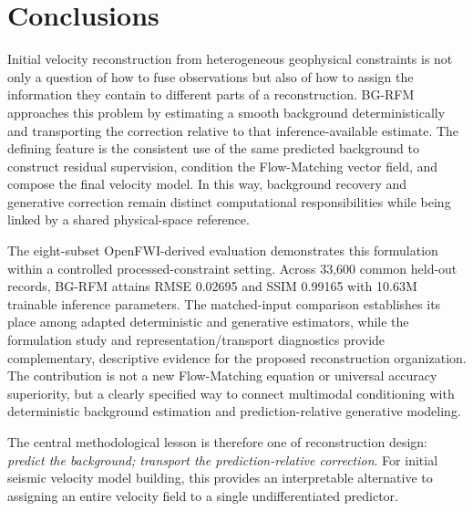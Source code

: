 \section{Conclusions}

Initial velocity reconstruction from heterogeneous geophysical constraints is not only a question of how to fuse observations but also of how to assign the information they contain to different parts of a reconstruction. BG-RFM approaches this problem by estimating a smooth background deterministically and transporting the correction relative to that inference-available estimate. The defining feature is the consistent use of the same predicted background to construct residual supervision, condition the Flow-Matching vector field, and compose the final velocity model. In this way, background recovery and generative correction remain distinct computational responsibilities while being linked by a shared physical-space reference.

The eight-subset OpenFWI-derived evaluation demonstrates this formulation within a controlled processed-constraint setting. Across 33,600 common held-out records, BG-RFM attains RMSE 0.02695 and SSIM 0.99165 with 10.63M trainable inference parameters. The matched-input comparison establishes its place among adapted deterministic and generative estimators, while the formulation study and representation/transport diagnostics provide complementary, descriptive evidence for the proposed reconstruction organization. The contribution is not a new Flow-Matching equation or universal accuracy superiority, but a clearly specified way to connect multimodal conditioning with deterministic background estimation and prediction-relative generative modeling.

The central methodological lesson is therefore one of reconstruction design: \emph{predict the background; transport the prediction-relative correction}. For initial seismic velocity model building, this provides an interpretable alternative to assigning an entire velocity field to a single undifferentiated predictor.
